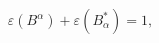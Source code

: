 \begin{equation}
\varepsilon(B^{\alpha})+\varepsilon(B_{\alpha}^{\ast})=1,\label{3.27}
\end{equation}

